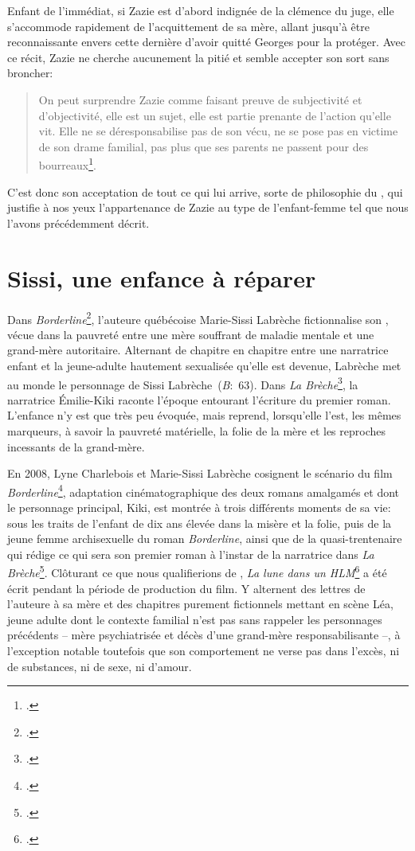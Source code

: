 Enfant de l'immédiat, si Zazie est d'abord indignée de la clémence du juge, elle s'accommode rapidement de l'acquittement de sa mère, allant jusqu'à être reconnaissante envers cette dernière d'avoir quitté Georges pour la protéger.
Avec ce récit, Zazie ne cherche aucunement la pitié et semble accepter son sort sans broncher:
\begin{quote}
  \begin{singlespace}
    \small
    On peut surprendre Zazie comme faisant preuve de subjectivité et d'objectivité, elle est un sujet, elle est partie prenante de l'action qu'elle vit. Elle ne se déresponsabilise pas de son vécu, ne se pose pas en victime de son drame familial, pas plus que ses parents ne passent pour des bourreaux\footcite[90]{Maurin2007}.
    \normalsize
  \end{singlespace}
\end{quote}
C'est donc son acceptation de tout ce qui lui arrive, sorte de philosophie du , qui justifie à nos yeux l'appartenance de Zazie au type de l'enfant-femme tel que nous l'avons précédemment décrit.


\section{Sissi, une enfance à réparer}
Dans \textit{Borderline}\footcite{Labreche2003}, l'auteure québécoise Marie-Sissi Labrèche fictionnalise son , vécue dans la pauvreté entre une mère souffrant de maladie mentale et une grand-mère autoritaire.
Alternant de chapitre en chapitre entre une narratrice enfant et la jeune-adulte hautement sexualisée qu'elle est devenue, Labrèche met au monde le personnage de Sissi Labrèche~(\textit{B}:~63).
Dans \textit{La Brèche}\footcite{Labreche2008}, la narratrice Émilie-Kiki raconte l'époque entourant l'écriture du premier roman. L'enfance n'y est que très peu évoquée, mais reprend, lorsqu'elle l'est, les mêmes marqueurs, à savoir la pauvreté matérielle, la folie de la mère et les reproches incessants de la grand-mère.
\par
En 2008, Lyne Charlebois et Marie-Sissi Labrèche cosignent le scénario du film \textit{Borderline}\footcite{Charlebois2008}, adaptation cinématographique des deux romans amalgamés et dont le personnage principal, Kiki, est montrée à trois différents moments de sa vie: sous les traits de l'enfant de dix ans élevée dans la misère et la folie, puis de la jeune femme archisexuelle du roman \textit{Borderline}, ainsi que de la quasi-trentenaire qui rédige ce qui sera son premier roman à l'instar de la narratrice dans \textit{La Brèche}\footcite[85]{Ledoux-Beaugrand2009}.
Clôturant ce que nous qualifierions de , \textit{La lune dans un HLM}\footcite{Labreche2008b} a été écrit pendant la période de production du film.
Y alternent des lettres de l'auteure à sa mère et des chapitres purement fictionnels mettant en scène Léa, jeune adulte dont le contexte familial n'est pas sans rappeler les personnages précédents -- mère psychiatrisée et décès d'une grand-mère responsabilisante --, à l'exception notable toutefois que son comportement ne verse pas dans l'excès, ni de substances, ni de sexe, ni d'amour.


